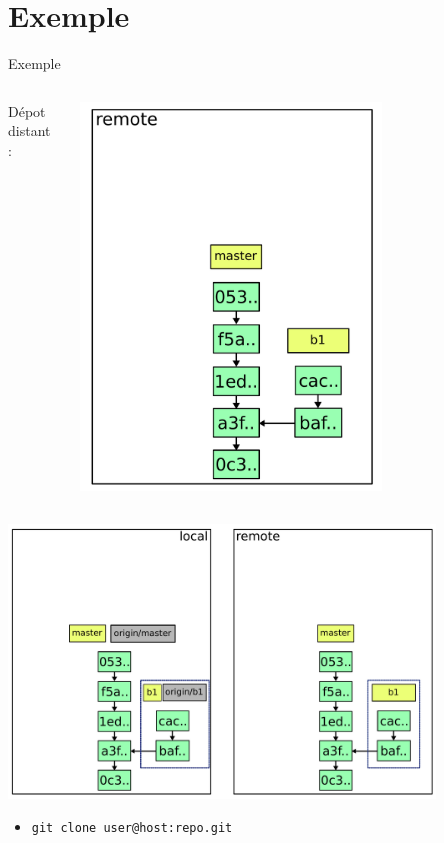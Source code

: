 \documentclass{beamer}
\begin{document}
\section{Exemple}
\begin{frame}{Exemple}
  \begin{columns}
  \begin{column}{0.5\textwidth}
  \huge Dépot distant :
  \end{column}
  \begin{column}{0.5\textwidth}
  \includegraphics[width=0.70\textwidth]{img/1.pdf}
  \end{column}
  \end{columns}
\end{frame}

\begin{frame}{}
  \centering
  \includegraphics[width=0.85\textwidth]{img/2.pdf}
  \begin{itemize}
  \small
  \item \lstinline|git clone user@host:repo.git| \vspace{0.52cm} \\
  \end{itemize}
\end{frame}
\end{document}
